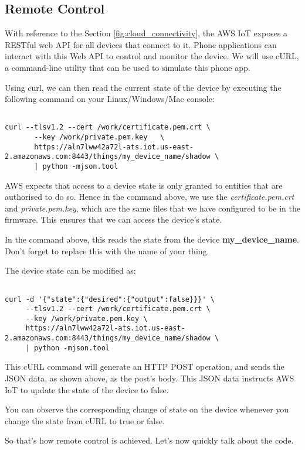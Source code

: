 \documentclass[main.tex]{subfiles}
\begin{document}
\subsection{Remote Control}
With reference to the Section \ref{fig:cloud_connectivity}, the AWS IoT exposes a RESTful web API for all devices that connect to it. Phone applications can interact with this Web API to control and monitor the device. We will use cURL, a command-line utility that can be used to simulate this phone app. 

Using curl, we can then read the current state of the device by executing the following command on your Linux/Windows/Mac console:
\begin{verbatim}

curl --tlsv1.2 --cert /work/certificate.pem.crt \
       --key /work/private.pem.key   \
       https://aln7lww42a72l-ats.iot.us-east-2.amazonaws.com:8443/things/my_device_name/shadow \ 
       | python -mjson.tool

\end{verbatim}

AWS expects that access to a device state is only granted to entities that are authorised to do so. Hence in the command above, we use the \textit{certificate.pem.crt} and \textit{private.pem.key}, which are the same files that we have configured to be in the firmware. This ensures that we can access the device's state.

In the command above, this reads the state from the device \textbf{my\_device\_name}. Don't forget to replace this with the name of your thing.

The device state can be modified as:
\begin{verbatim}

curl -d '{"state":{"desired":{"output":false}}}' \ 
     --tlsv1.2 --cert /work/certificate.pem.crt \ 
     --key /work/private.pem.key \ 
     https://aln7lww42a72l-ats.iot.us-east-2.amazonaws.com:8443/things/my_device_name/shadow \ 
     | python -mjson.tool
\end{verbatim}

This cURL command will generate an HTTP POST operation, and sends the JSON data, as shown above, as the post's body. This JSON data instructs AWS IoT to update the state of the device to false.

You can observe the corresponding change of state on the device whenever you change the state from cURL to true or false.

So that's how remote control is achieved. Let's now quickly talk about the code.
\end{document}
